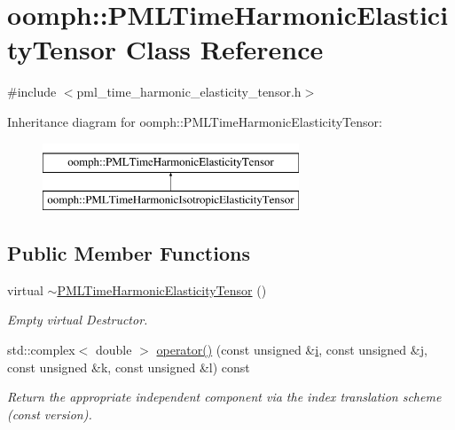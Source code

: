 \hypertarget{classoomph_1_1PMLTimeHarmonicElasticityTensor}{}\section{oomph\+:\+:P\+M\+L\+Time\+Harmonic\+Elasticity\+Tensor Class Reference}
\label{classoomph_1_1PMLTimeHarmonicElasticityTensor}


{\ttfamily \#include $<$pml\+\_\+time\+\_\+harmonic\+\_\+elasticity\+\_\+tensor.\+h$>$}

Inheritance diagram for oomph\+:\+:P\+M\+L\+Time\+Harmonic\+Elasticity\+Tensor\+:\begin{figure}[H]
\begin{center}
\leavevmode
\includegraphics[height=2.000000cm]{classoomph_1_1PMLTimeHarmonicElasticityTensor}
\end{center}
\end{figure}
\subsection*{Public Member Functions}
\begin{DoxyCompactItemize}
\item 
virtual \hyperlink{classoomph_1_1PMLTimeHarmonicElasticityTensor_a520e58b90e02cc9c36f39102e32afa3f}{$\sim$\+P\+M\+L\+Time\+Harmonic\+Elasticity\+Tensor} ()
\begin{DoxyCompactList}\small\item\em Empty virtual Destructor. \end{DoxyCompactList}\item 
std\+::complex$<$ double $>$ \hyperlink{classoomph_1_1PMLTimeHarmonicElasticityTensor_ac253ca0d5530e06f9596a9be7bb728d2}{operator()} (const unsigned \&\hyperlink{cfortran_8h_adb50e893b86b3e55e751a42eab3cba82}{i}, const unsigned \&j, const unsigned \&k, const unsigned \&l) const
\begin{DoxyCompactList}\small\item\em Return the appropriate independent component via the index translation scheme (const version). \end{DoxyCompactList}\end{DoxyCompactItemize}
